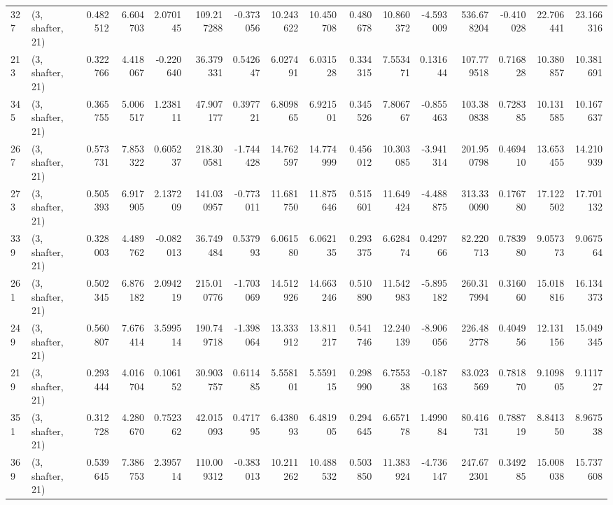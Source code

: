 \begin{tabular}{llrrrrrrrrrrrrrr}
327 &  (3, shafter, 21) &   0.482512 &   6.604703 &   2.070145 &   109.217288 &  -0.373056 &  10.243622 &  10.450708 &  0.480678 &  10.860372 &  -4.593009 &    536.678204 &  -0.410028 &  22.706441 &   23.166316 \\
213 &  (3, shafter, 21) &   0.322766 &   4.418067 &  -0.220640 &    36.379331 &   0.542647 &   6.027491 &   6.031528 &  0.334315 &   7.553471 &   0.131644 &    107.779518 &   0.716828 &  10.380857 &   10.381691 \\
345 &  (3, shafter, 21) &   0.365755 &   5.006517 &   1.238111 &    47.907177 &   0.397721 &   6.809865 &   6.921501 &  0.345526 &   7.806767 &  -0.855463 &    103.380838 &   0.728385 &  10.131585 &   10.167637 \\
267 &  (3, shafter, 21) &   0.573731 &   7.853322 &   0.605237 &   218.300581 &  -1.744428 &  14.762597 &  14.774999 &  0.456012 &  10.303085 &  -3.941314 &    201.950798 &   0.469410 &  13.653455 &   14.210939 \\
273 &  (3, shafter, 21) &   0.505393 &   6.917905 &   2.137209 &   141.030957 &  -0.773011 &  11.681750 &  11.875646 &  0.515601 &  11.649424 &  -4.488875 &    313.330090 &   0.176780 &  17.122502 &   17.701132 \\
339 &  (3, shafter, 21) &   0.328003 &   4.489762 &  -0.082013 &    36.749484 &   0.537993 &   6.061580 &   6.062135 &  0.293375 &   6.628474 &   0.429766 &     82.220713 &   0.783980 &   9.057373 &    9.067564 \\
261 &  (3, shafter, 21) &   0.502345 &   6.876182 &   2.094219 &   215.010776 &  -1.703069 &  14.512926 &  14.663246 &  0.510890 &  11.542983 &  -5.895182 &    260.317994 &   0.316060 &  15.018816 &   16.134373 \\
249 &  (3, shafter, 21) &   0.560807 &   7.676414 &   3.599514 &   190.749718 &  -1.398064 &  13.333912 &  13.811217 &  0.541746 &  12.240139 &  -8.906056 &    226.482778 &   0.404956 &  12.131156 &   15.049345 \\
219 &  (3, shafter, 21) &   0.293444 &   4.016704 &   0.106152 &    30.903757 &   0.611485 &   5.558101 &   5.559115 &  0.298990 &   6.755338 &  -0.187163 &     83.023569 &   0.781870 &   9.109805 &    9.111727 \\
351 &  (3, shafter, 21) &   0.312728 &   4.280670 &   0.752362 &    42.015093 &   0.471795 &   6.438093 &   6.481905 &  0.294645 &   6.657178 &   1.499084 &     80.416731 &   0.788719 &   8.841350 &    8.967538 \\
369 &  (3, shafter, 21) &   0.539645 &   7.386753 &   2.395714 &   110.009312 &  -0.383013 &  10.211262 &  10.488532 &  0.503850 &  11.383924 &  -4.736147 &    247.672301 &   0.349285 &  15.008038 &   15.737608 \\

\end{tabular}
